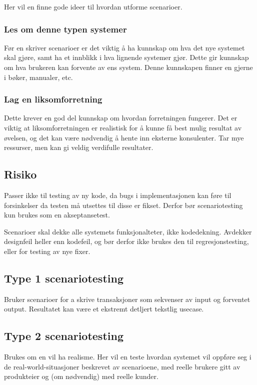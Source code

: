 Her vil en finne gode ideer til hvordan utforme scenarioer.

\subsubsection{Les om denne typen systemer}

Før en skriver scenarioer er det viktig å ha kunnskap om hva det nye
systemet skal gjøre, samt ha et innblikk i hva lignende systemer gjør.
Dette gir kunnskap om hva brukeren kan forvente av ens system. Denne
kunnskapen finner en gjerne i bøker, manualer, etc.

\subsubsection{Lag en liksomforretning}

Dette krever en god del kunnskap om hvordan forretningen fungerer. Det
er viktig at liksomforretningen er realistisk for å kunne få best mulig
resultat av øvelsen, og det kan være nødvendig å hente inn eksterne
konsulenter. Tar mye ressurser, men kan gi veldig verdifulle resultater.

\subsection{Risiko}

Passer ikke til testing av ny kode, da bugs i implementasjonen kan føre
til forsinkelser da testen må utsettes til disse er fikset. Derfor bør
scenariotesting kun brukes som en akseptansetest.

Scenarioer skal dekke alle systemets funksjonalteter, ikke kodedekning.
Avdekker designfeil heller enn kodefeil, og bør derfor ikke brukes den
til regresjonstesting, eller for testing av nye fixer.

\subsection{Type 1 scenariotesting}

Bruker scenarioer for a skrive transaksjoner som sekvenser av input og
forventet output. Resultatet kan være et ekstremt detljert tekstlig
usecase.

\subsection{Type 2 scenariotesting}

Brukes om en vil ha realisme. Her vil en teste hvordan systemet vil
oppføre seg i de real-world-situasjoner beskrevet av scenarioene, med
reelle brukere gitt av produkteier og (om nødvendig) med reelle kunder.

